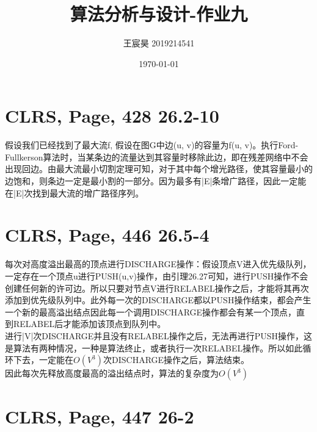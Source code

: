 \documentclass[UTF8]{ctexart}
\title{算法分析与设计-作业九}
\author{王宸昊 2019214541}
\date{\today}
\begin{document}
\maketitle


\section{CLRS, Page, 428 26.2-10}

假设我们已经找到了最大流f, 假设在图G中边(u, v)的容量为f(u, v)。执行Ford-Fullkerson算法时，当某条边的流量达到其容量时移除此边，即在残差网络中不会出现回边。由最大流最小切割定理可知，对于其中每个增光路径，使其容量最小的边饱和，则条边一定是最小割的一部分。因为最多有|E|条增广路径，因此一定能在|E|次找到最大流的增广路径序列。



\section{CLRS, Page, 446 26.5-4}

每次对高度溢出最高的顶点进行DISCHARGE操作：假设顶点V进入优先级队列，一定存在一个顶点u进行PUSH(u,v)操作，由引理26.27可知，进行PUSH操作不会创建任何新的许可边。所以只要对节点V进行RELABEL操作之后，才能将其再次添加到优先级队列中。此外每一次的DISCHARGE都以PUSH操作结束，都会产生一个新的最高溢出结点因此每一个调用DISCHARGE操作都会有某一个顶点，直到RELABEL后才能添加该顶点到队列中。\\
进行|V|次DISCHARGE并且没有RELABEL操作之后，无法再进行PUSH操作，这是算法有两种情况，一种是算法终止，或者执行一次RELABEL操作。所以如此循环下去，一定能在$O(V^3)$次DISCHARGE操作之后，算法结束。\\
因此每次先释放高度最高的溢出结点时，算法的复杂度为$O(V^3)$


\section{CLRS, Page, 447 26-2}
\end{document}
